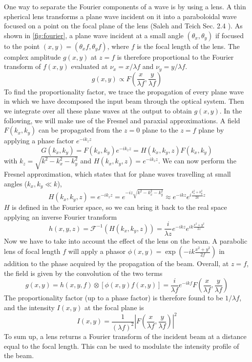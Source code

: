 One way to separate the Fourier components of a wave is by using a lens. A thin spherical lens transforms a plane wave incident on it into a paraboloidal wave focused on a point on the focal plane of the lens (Saleh and Teich Sec. 2.4 \cite{saleh1991}). As shown in \cref{fig:fourier}, a plane wave incident at a small angle $(\theta_x, \theta_y)$ if focused to the point $(x,y) = (\theta_x f, \theta_y f)$, where $f$ is the focal length of the lens. The complex amplitude $g(x,y)$ at $z=f$ is therefore proportional to the Fourier transform of $f(x,y)$ evaluated at $\nu_x = x / \lambda f$ and $\nu_y = y / \lambda f$.
\begin{equation}
    g(x,y) \propto F\left(\frac{x}{\lambda f}, \frac{y}{\lambda f}\right)
\end{equation}
To find the proportionality factor, we trace the propagation of every plane wave in which we have decomposed the input beam through the optical system. Then we integrate over all these plane waves at the output to obtain $g(x,y)$. In the following, we will make use of the Fresnel and paraxial approximations.
A field $F(k_x,k_y)$ can be propagated from the $z=0$ plane to the $z=f$ plane by applying a phase factor $e^{-ik_zz}$
\begin{equation}
    G(k_x, k_y) = F(k_x,k_y) e^{-ik_zz} = H(k_x, k_y, z) F(k_x, k_y)
\end{equation}
with $k_z = \sqrt{k^2 - k_x^2 - k_y^2}$ and  $H(k_x, k_y, z) = e^{-ik_zz}$. We can now perform the Fresnel approximation, which states that for plane waves travelling at small angles ($k_x, k_y \ll k$),
\begin{equation}
    H(k_x, k_y, z) = e^{-ik_zz} = e^{-iz\sqrt{k^2 - k_x^2 - k_y^2}} \approx e^{-ikz}e^{i\frac{k_x^2 + k_y^2}{2k}z}
\end{equation}
$H$ is defined in the Fourier space, so we can bring it back to the real space applying an inverse Fourier transform
\begin{equation}
    h(x,y,z) = \mathcal{F}^{-1}(H(k_x, k_y, z)) = \frac{i}{\lambda z} e^{-ikz} e^{ik\frac{x^2+y^2}{2z}}
\end{equation}
Now we have to take into account the effect of the lens on the beam. A parabolic lens of focal length $f$ will apply a phasor $\phi(x,y) = \exp(-ik\frac{x^2+y^2}{2f})$ in addition to the phase acquired by the propagation of the beam. Overall, at $z=f$, the field is given by the convolution of the two terms
\begin{equation}
    g(x,y) = h(x,y,f) \otimes \left[ \phi(x,y) f(x,y) \right]
    = \frac{i}{\lambda f} e^{-ikf} F\left(\frac{x}{\lambda f}, \frac{y}{\lambda f}\right)
\end{equation}
The proportionality factor (up to a phase factor) is therefore found to be $1/\lambda f$,
and the intensity $I(x,y)$ at the focal plane is
\begin{equation}
    I(x,y) = \frac{1}{(\lambda f)^2} \left| F\left(\frac{x}{\lambda f}, \frac{y}{\lambda f}\right) \right|^2
\end{equation}
To sum up, a lens returns a Fourier transform of the incident beam at a distance equal to the focal length. This can be used to modulate the intensity profile of the beam.

